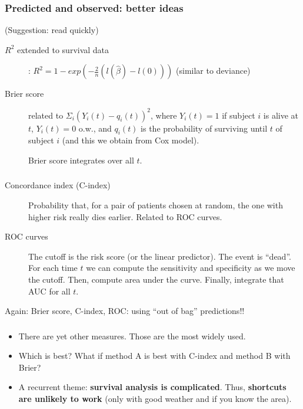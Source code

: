 \begin{frame}[label=brierscore]
\frametitle{Predicted and observed: better ideas}
(Suggestion: read quickly)

\begin{description}
\item[$R^2$ extended to survival data]: $R^2 = 1 -
  exp(-\frac{2}{n}(l(\hat{\beta}) - l(0)))$ (similar to deviance)

\item[Brier score] related to $\Sigma_i (Y_i(t) - q_i(t))^2$, where 
$Y_i(t) = 1$ if subject $i$ is alive at $t$, $Y_i(t) = 0$ o.w., and 
$q_i(t)$ is the probability of surviving until  $t$ of subject $i$ (and
this we obtain from Cox model).

Brier score integrates over all  $t$.
\end{description}
\end{frame}


\begin{frame}
\frametitle{}
\begin{description}
\item[Concordance index (C-index)] Probability that, for a pair of
  patients chosen at random, the one with higher risk really dies
  earlier. Related to ROC curves.
  
\item[ROC curves] The cutoff is the risk score (or the linear
  predictor). The event is ``dead''. For each time $t$ we can compute the
  sensitivity and specificity as we move the cutoff. Then, compute area
  under the curve. Finally, integrate that AUC for all $t$.
\end{description}

Again: Brier score, C-index, ROC: using ``out of bag'' predictions!!

\end{frame}


\begin{frame}
\frametitle{}
\begin{itemize}
\item There are yet other measures. Those are the most widely used.
\item Which is best? What if method A is best with C-index and method B
  with Brier?
\item A recurrent theme: \textbf{survival analysis is complicated}. Thus,
  \textbf{shortcuts are unlikely to work} (only with good weather and if
  you know the area).
\end{itemize}
\end{frame}




